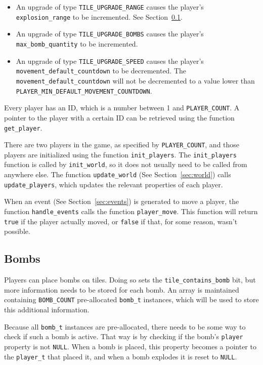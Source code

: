 \begin{itemize}
\item An upgrade of type \texttt{TILE\_UPGRADE\_RANGE} causes the player's
  \texttt{explosion\_range} to be incremented. See Section~\ref{sec:bombs}.
\item An upgrade of type \texttt{TILE\_UPGRADE\_BOMBS} causes the player's
  \texttt{max\_bomb\_quantity} to be incremented.
\item An upgrade of type \texttt{TILE\_UPGRADE\_SPEED} causes the player's
  \texttt{movement\_default\_countdown} to be decremented. The
  \texttt{movement\_default\_countdown} will not be decremented to a value
  lower than \texttt{PLAYER\_MIN\_DEFAULT\_MOVEMENT\_COUNTDOWN}.
\end{itemize}

Every player has an ID, which is a number between 1 and \texttt{PLAYER\_COUNT}.
A pointer to the player with a certain ID can be retrieved using the function
\texttt{get\_player}.

There are two players in the game, as specified by \texttt{PLAYER\_COUNT}, and
those players are initialized using the function \texttt{init\_players}. The
\texttt{init\_players} function is called by \texttt{init\_world}, so it does
not usually need to be called from anywhere else. The function
\texttt{update\_world} (See Section~\ref{sec:world}) calls
\texttt{update\_players}, which updates the relevant properties of each player.

When an event (See Section~\ref{sec:events}) is generated to move a player, the
function \texttt{handle\_events} calls the function \texttt{player\_move}. This
function will return \texttt{true} if the player actually moved, or
\texttt{false} if that, for some reason, wasn't possible.

\subsection{Bombs}
\label{sec:bombs}

Players can place bombs on tiles. Doing so sets the
\texttt{tile\_contains\_bomb} bit, but more information needs to be stored for
each bomb. An array is maintained containing \texttt{BOMB\_COUNT} pre-allocated
\texttt{bomb\_t} instances, which will be used to store this additional
information.

Because all \texttt{bomb\_t} instances are pre-allocated, there needs to be
some way to check if such a bomb is active. That way is by checking if the
bomb's \texttt{player} property is not \texttt{NULL}. When a bomb is placed,
this property becomes a pointer to the \texttt{player\_t} that placed it, and
when a bomb explodes it is reset to \texttt{NULL}.

